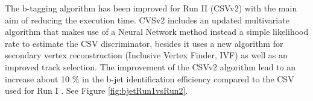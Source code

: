 \begin{table}[ht]%
\end{table}



The b-tagging algorithm has been improved for Run II (CSVv2) with the main aim of reducing
the execution time. CVSv2 includes an updated multivariate algorithm
that makes use of a Neural Network method instead a simple likelihood rate to estimate the CSV discriminator, 
besides it uses a new algorithm for secondary vertex reconstruction (Inclusive Vertex Finder, IVF) as well as   
an improved track selection. The improvement of the CSVv2 algorithm lead to an increase about 10 $\%$ in 
the b-jet identification efficiency compared to the CSV used for Run I \cite{1742-6596-664-8-082055}. See Figure \ref{fig:bjetRun1vsRun2}.

